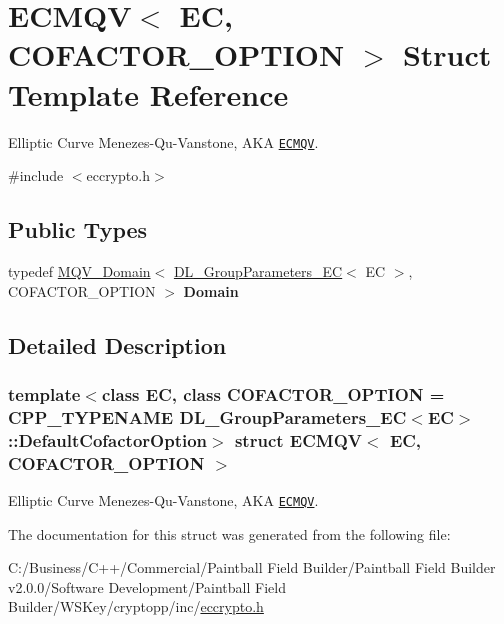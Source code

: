 \hypertarget{struct_e_c_m_q_v}{
\section{ECMQV$<$ EC, COFACTOR\_\-OPTION $>$ Struct Template Reference}
\label{struct_e_c_m_q_v}
}


Elliptic Curve Menezes-\/Qu-\/Vanstone, AKA \href{http://www.weidai.com/scan-mirror/ka.html#ECMQV}{\tt ECMQV}.  


{\ttfamily \#include $<$eccrypto.h$>$}\subsection*{Public Types}
\begin{DoxyCompactItemize}
\item 
\hypertarget{struct_e_c_m_q_v_adc1a8fd81ed344d576fc3386c64b5419}{
typedef \hyperlink{class_m_q_v___domain}{MQV\_\-Domain}$<$ \hyperlink{class_d_l___group_parameters___e_c}{DL\_\-GroupParameters\_\-EC}$<$ EC $>$, COFACTOR\_\-OPTION $>$ {\bfseries Domain}}
\label{struct_e_c_m_q_v_adc1a8fd81ed344d576fc3386c64b5419}

\end{DoxyCompactItemize}


\subsection{Detailed Description}
\subsubsection*{template$<$class EC, class COFACTOR\_\-OPTION = CPP\_\-TYPENAME DL\_\-GroupParameters\_\-EC$<$EC$>$::DefaultCofactorOption$>$ struct ECMQV$<$ EC, COFACTOR\_\-OPTION $>$}

Elliptic Curve Menezes-\/Qu-\/Vanstone, AKA \href{http://www.weidai.com/scan-mirror/ka.html#ECMQV}{\tt ECMQV}. 

The documentation for this struct was generated from the following file:\begin{DoxyCompactItemize}
\item 
C:/Business/C++/Commercial/Paintball Field Builder/Paintball Field Builder v2.0.0/Software Development/Paintball Field Builder/WSKey/cryptopp/inc/\hyperlink{eccrypto_8h}{eccrypto.h}\end{DoxyCompactItemize}
